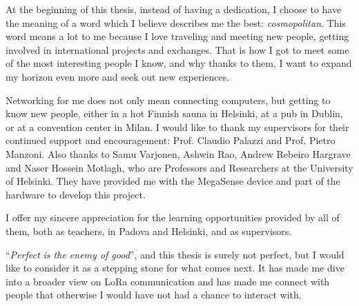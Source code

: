 
At the beginning of this thesis, instead of having a dedication, I choose to have the meaning of a word which I believe describes me the best: \textit{cosmopolitan}.
This word means a lot to me because I love traveling and meeting new people, getting involved in international projects and exchanges.
That is how I got to meet some of the most interesting people I know, and why thanks to them, I want to expand my horizon even more and seek out new experiences.

Networking for me does not only mean connecting computers, but getting to know new people, either in a hot Finnish sauna in Helsinki, at a pub in Dublin, or at a convention center in Milan.
\newline
\newline
\indent
I would like to thank my supervisors for their continued support and encouragement: Prof. Claudio Palazzi and Prof. Pietro Manzoni.
Also thanks to Samu Varjonen, Ashwin Rao, Andrew Rebeiro Hargrave and ‪Naser Hossein Motlagh‬, who are Professors and Researchers at the University of Helsinki.
They have provided me with the MegaSense device and part of the hardware to develop this project.

I offer my sincere appreciation for the learning opportunities provided by all of them, both as teachers, in Padova and Helsinki, and as supervisors.

``\textit{Perfect is the enemy of good}'',  and this thesis is surely not perfect, but I would like to consider it as a stepping stone for what comes next.
It has made me dive into a broader view on LoRa communication and has made me connect with people that otherwise I would have not had a chance to interact with.